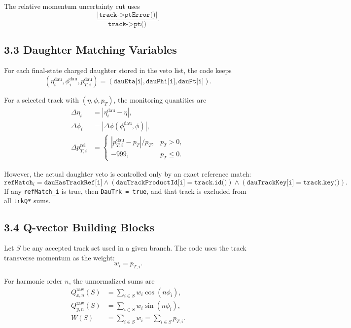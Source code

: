 \documentclass[11pt]{article}
\begin{document}
The relative momentum uncertainty cut uses
\[
\frac{|\texttt{track->ptError()}|}{\texttt{track->pt()}}.
\]

\subsection*{3.3 Daughter Matching Variables}

For each final-state charged daughter stored in the veto list, the code keeps
\[
(\eta_i^{\mathrm{dau}}, \phi_i^{\mathrm{dau}}, p_{T,i}^{\mathrm{dau}})
=
(\texttt{dauEta[i]}, \texttt{dauPhi[i]}, \texttt{dauPt[i]}).
\]

For a selected track with $(\eta,\phi,p_T)$, the monitoring quantities are
\begin{align*}
\Delta\eta_i &= \left|\eta_i^{\mathrm{dau}} - \eta\right|, \\
\Delta\phi_i &= \left|\Delta\phi(\phi_i^{\mathrm{dau}}, \phi)\right|, \\
\Delta p_{T,i}^{\mathrm{rel}} &=
\begin{cases}
\left|p_{T,i}^{\mathrm{dau}} - p_T\right|/p_T, & p_T > 0,\\
-999, & p_T \le 0.
\end{cases}
\end{align*}

However, the actual daughter veto is controlled only by an exact reference match:
\[
\texttt{refMatch}_i =
\texttt{dauHasTrackRef[i]}
\land
\left(\texttt{dauTrackProductId[i]} = \texttt{track.id()}\right)
\land
\left(\texttt{dauTrackKey[i]} = \texttt{track.key()}\right).
\]
If any \texttt{refMatch\_i} is true, then \texttt{DauTrk = true}, and that track is excluded
from all \texttt{trkQ*} sums.

\subsection*{3.4 Q-vector Building Blocks}

Let $S$ be any accepted track set used in a given branch. The code uses the track transverse
momentum as the weight:
\[
w_i = p_{T,i}.
\]

For harmonic order $n$, the unnormalized sums are
\begin{align*}
Q_{x,n}^{\mathrm{raw}}(S) &= \sum_{i \in S} w_i \cos(n\phi_i), \\
Q_{y,n}^{\mathrm{raw}}(S) &= \sum_{i \in S} w_i \sin(n\phi_i), \\
W(S) &= \sum_{i \in S} w_i = \sum_{i \in S} p_{T,i}.
\end{align*}
\end{document}

